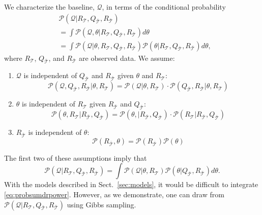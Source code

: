 \documentclass[journal]{IEEEtran}
\newcommand{\prob}{\mathcal{P}}
\newcommand{\eventset}{\mathcal{T}}
\newcommand{\context}{{\bar {\mathcal{T}}}}
\newcommand{\drpower}{Q}
\newcommand{\sumdrpower}{{\mathcal{Q}}}
\newcommand{\referencepower}{R}
\newcommand{\outdr}{\drpower_\context}
\newcommand{\inreference}{\referencepower_\eventset}
\newcommand{\outreference}{\referencepower_\context}
\begin{document}
We characterize the baseline, $\sumdrpower$, in terms of the conditional
probability
\begin{align*}
  &\prob(\sumdrpower|\inreference, \outdr, \outreference) \\
  &= \int \prob \left( \sumdrpower, \theta |\inreference, \outdr,
    \outreference \right) d\theta \\
  &= \int \prob \left( \sumdrpower | \theta, \inreference, \outdr,
    \outreference \right) \prob \left( \theta| \inreference, \outdr,
    \outreference \right) d\theta,
\end{align*}
where $\inreference$, $\outdr$, and $\outreference$ are observed data.
We assume:
\begin{enumerate}
\item $\sumdrpower$ is independent of $\outdr$ and $\outreference$ given
  $\theta$ and $\inreference$:
  \begin{equation}
    \label{eq:independenceA}
    \prob(\sumdrpower, \outdr, \outreference | \theta, \inreference) =
    \prob(\sumdrpower | \theta, \inreference) \cdot
    \prob(\outdr, \outreference | \theta, \inreference)
  \end{equation}
\item $\theta$ is independent of $\inreference$ given $\outreference$
  and $\outdr$:
  \begin{equation}
    \label{eq:independenceB}
    \prob(\theta, \inreference| \outreference, \outdr) =
    \prob(\theta, | \outreference, \outdr) \cdot
    \prob(\inreference| \outreference, \outdr)
  \end{equation}
\item $\outreference$ is independent of $\theta$:
  \begin{equation}
    \label{eq:indepencenceC}
    \prob(\outreference, \theta) = \prob(\outreference) \prob(\theta)
  \end{equation}

\end{enumerate}
The first two of these assumptions imply that
\begin{equation}
  \label{eq:probsumdrpower}
  \prob(\sumdrpower|\inreference, \outdr, \outreference) = \int \prob \left(
    \sumdrpower | \theta, \inreference \right) \prob \left( \theta| \outdr,
    \outreference \right) d\theta.
\end{equation}
With the models described in Sect.~\ref{sec:models}, it would be
difficult to integrate \eqref{eq:probsumdrpower}.  However, as we
demonstrate, one can draw from
$\prob(\sumdrpower|\inreference, \outdr, \outreference)$ using Gibbs
sampling.
\end{document}
